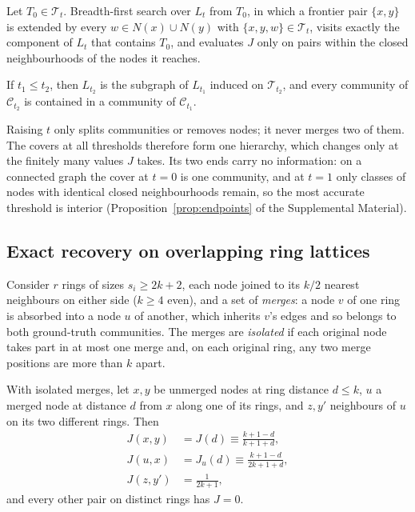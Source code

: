 \begin{proposition}
\label{prop:local}
Let $T_0\in\mathcal T_t$. Breadth-first search over $L_t$ from $T_0$, in which a
frontier pair $\{x,y\}$ is extended by every $w\in N(x)\cup N(y)$ with
$\{x,y,w\}\in\mathcal T_t$, visits exactly the component of $L_t$ that contains $T_0$,
and evaluates $J$ only on pairs within the closed neighbourhoods of the nodes it
reaches.
\end{proposition}

\begin{theorem}[Nesting]
\label{thm:nesting}
If $t_1\le t_2$, then $L_{t_2}$ is the subgraph of $L_{t_1}$ induced on
$\mathcal T_{t_2}$, and every community of $\mathcal C_{t_2}$ is contained in a
community of $\mathcal C_{t_1}$.
\end{theorem}
Raising $t$ only splits communities or removes nodes; it never merges two of them. The
covers at all thresholds therefore form one hierarchy, which changes only at the
finitely many values $J$ takes. Its two ends carry no information: on a connected graph
the cover at $t=0$ is one community, and at $t=1$ only classes of nodes with identical
closed neighbourhoods remain, so the most accurate threshold is interior
(Proposition~\ref{prop:endpoints} of the Supplemental Material).

\subsection{Exact recovery on overlapping ring lattices}

Consider $r$ rings of sizes $s_i\ge 2k+2$, each node joined to its $k/2$ nearest
neighbours on either side ($k\ge4$ even), and a set of \emph{merges}: a node $v$ of one
ring is absorbed into a node $u$ of another, which inherits $v$'s edges and so belongs
to both ground-truth communities. The merges are \emph{isolated} if each original node
takes part in at most one merge and, on each original ring, any two merge positions are
more than $k$ apart.

\begin{lemma}
\label{lem:ringJ}
With isolated merges, let $x,y$ be unmerged nodes at ring distance $d\le k$, $u$ a
merged node at distance $d$ from $x$ along one of its rings, and $z,y'$ neighbours of
$u$ on its two different rings. Then
\begin{equation}
\begin{aligned}
  J(x,y)&=J(d)\equiv\frac{k+1-d}{k+1+d},\\
  J(u,x)&=J_u(d)\equiv\frac{k+1-d}{2k+1+d},\\
  J(z,y')&=\frac{1}{2k+1},
\end{aligned}
  \label{eq:ringJ}
\end{equation}
and every other pair on distinct rings has $J=0$.
\end{lemma}

